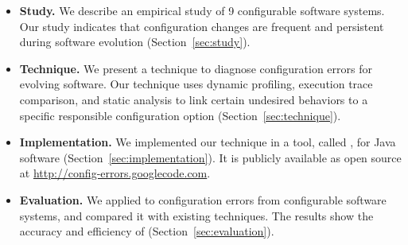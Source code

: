 \begin{itemize}
\vspace{-3mm}
\item \textbf{Study.} We describe an empirical
study of 9 configurable software systems.
Our study indicates that configuration changes
are frequent and persistent during software evolution (Section~\ref{sec:study}).

\item \textbf{Technique.} We present a technique to diagnose
configuration errors for evolving software. Our technique
uses dynamic profiling, execution trace comparison, and
static analysis to link certain undesired behaviors to a
specific responsible configuration option (Section~\ref{sec:technique}).

\item \textbf{Implementation.} We implemented our technique
in a tool, called \ourtool, for Java software (Section~\ref{sec:implementation}).
It is publicly available as open source at \url{http://config-errors.googlecode.com}.

\item \textbf{Evaluation.} We applied \ourtool to \errornum configuration
errors from \subjnum configurable software systems,
and compared it with existing techniques.
The results show the accuracy and efficiency of \ourtool (Section~\ref{sec:evaluation}).
\end{itemize}

